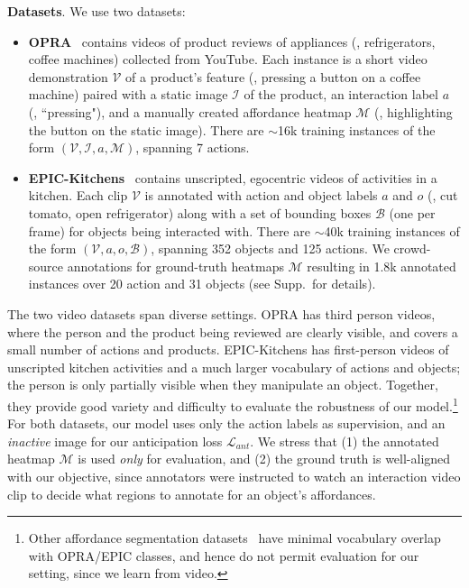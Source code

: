 \documentclass[10pt,twocolumn,letterpaper]{article}
\begin{document}
\vspace{0.05in}
\noindent\textbf{Datasets}. \label{sec:datasets}
We use two datasets:
\begin{itemize}[leftmargin=*]
\item \textbf{OPRA}~\cite{fang2018demo2vec} contains videos of product reviews of appliances (\eg, refrigerators, coffee machines) collected from YouTube. Each instance is a short video demonstration $\mathcal{V}$ of a product's feature (\eg, pressing a button on a coffee machine) paired with a static image $\mathcal{I}$ of the product, an interaction label $a$ (\eg, ``pressing"), and a manually created affordance heatmap $\mathcal{M}$ (\eg, highlighting the button on the static image). There are $\sim$16k training instances of the form $(\mathcal{V}, \mathcal{I}, a, \mathcal{M})$, spanning 7 actions. 

\item \textbf{EPIC-Kitchens}~\cite{damen2018scaling} contains unscripted, egocentric videos of activities in a kitchen. Each clip $\mathcal{V}$ is annotated with action and object labels $a$ and $o$ (\eg, cut tomato, open refrigerator) along with a set of bounding boxes $\mathcal{B}$ (one per frame) for objects being interacted with. There are $\sim$40k training instances of the form $(\mathcal{V}, a, o, \mathcal{B})$, spanning 352 objects and 125 actions. We crowd-source annotations for ground-truth heatmaps $\mathcal{M}$ resulting in 1.8k annotated instances over 20 action and 31 objects (see Supp.~for details).



\end{itemize}

The two video datasets span diverse settings.  OPRA has third person videos, where the person and the product being reviewed are clearly visible, and covers a small number of actions and products. EPIC-Kitchens has first-person videos of unscripted kitchen activities and a much larger vocabulary of actions and objects; the person is only partially visible when they manipulate an object.
Together, they provide good variety and difficulty to evaluate the robustness of our model.\footnote{Other affordance segmentation datasets~\cite{myers2015affordance,nguyen2016detecting} have minimal vocabulary overlap with OPRA/EPIC classes, and hence do not permit evaluation for our setting, since we learn from video.} For both datasets, our model uses only the action labels as supervision, and an \emph{inactive} image for our anticipation loss $\mathcal{L}_{ant}$. We stress that (1) the annotated heatmap $\mathcal{M}$ is used \emph{only} for evaluation, and (2) the ground truth is well-aligned with our objective, since annotators were instructed to watch an interaction video clip to decide what regions to annotate for an object's affordances.  
\end{document}
